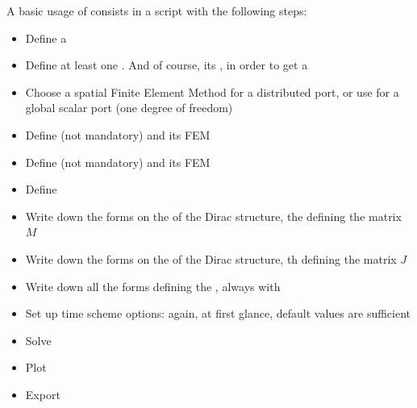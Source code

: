\documentclass[letterpaper,10pt,english]{sphinxmanual}
\begin{document}
\sphinxAtStartPar
A basic usage of  consists in a script with the following steps:
\begin{itemize}
\item {} 
\sphinxAtStartPar
Define a 

\item {} 
\sphinxAtStartPar
Define at least one . And of course, its , in order to get a 

\item {} 
\sphinxAtStartPar
Choose a spatial Finite Element Method for a distributed port, or use  for a global scalar port (one degree of freedom)

\item {} 
\sphinxAtStartPar
Define  (not mandatory) and its FEM

\item {} 
\sphinxAtStartPar
Define  (not mandatory) and its FEM

\item {} 
\sphinxAtStartPar
Define 

\item {} 
\sphinxAtStartPar
Write down the forms on the  of the Dirac structure,  the  defining the matrix \(M\)

\item {} 
\sphinxAtStartPar
Write down the forms on the  of the Dirac structure,  th  defining the matrix \(J\)

\item {} 
\sphinxAtStartPar
Write down all the forms defining the , always with 

\item {} 
\sphinxAtStartPar
Set up time scheme options: again, at first glance, default values are sufficient

\item {} 
\sphinxAtStartPar
Solve

\item {} 
\sphinxAtStartPar
Plot

\item {} 
\sphinxAtStartPar
Export

\end{itemize}
\end{document}
